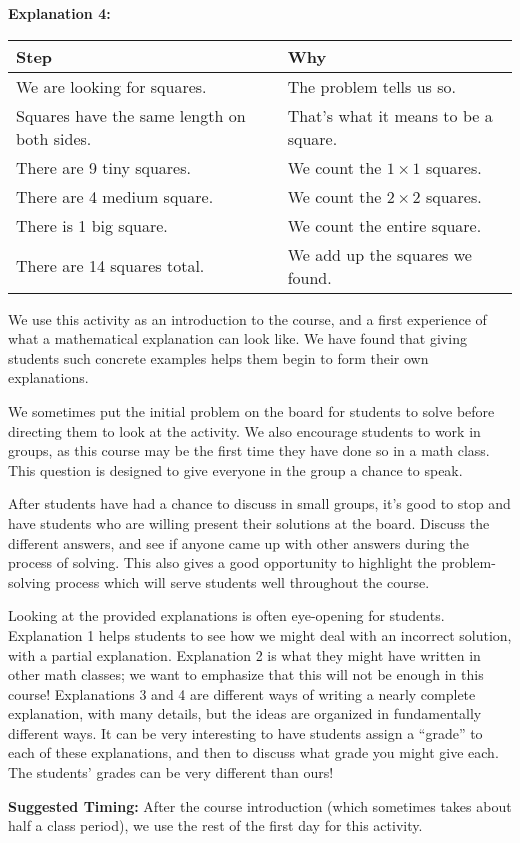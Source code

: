\documentclass{ximera}
\begin{document}
\begin{mdframed}
{\bf Explanation 4:}

\begin{tabularx}{\textwidth}{X|X}
    Step & Why  \\ \hline \hline
    We are looking for squares. & The problem tells us so. \\ \hline
    Squares have the same length on both sides. & That's what it means to be a square. \\ \hline
    There are 9 tiny squares. & We count the $1\times 1$ squares. \\ \hline
    There are 4 medium square. & We count the $2 \times 2$ squares. \\ \hline
    There is 1 big square. & We count the entire square. \\ \hline
    There are 14 squares total. & We add up the squares we found. \\
\end{tabularx}
\end{mdframed}




\newpage


\begin{instructorNotes}
We use this activity as an introduction to the course, and a first experience of what a mathematical explanation can look like.  We have found that giving students such concrete examples helps them begin to form their own explanations.


We sometimes put the initial problem on the board for students to solve before directing them to look at the activity.  We also encourage students to work in groups, as this course may be the first time they have done so in a math class.  This question is designed to give everyone in the group a chance to speak.

After students have had a chance to discuss in small groups, it's good to stop and have students who are willing present their solutions at the board.  Discuss the different answers, and see if anyone came up with other answers during the process of solving.  This also gives a good opportunity to highlight the problem-solving process which will serve students well throughout the course.



Looking at the provided explanations is often eye-opening for students.  Explanation 1 helps students to see how we might deal with an incorrect solution, with a partial explanation.  Explanation 2 is what they might have written in other math classes; we want to emphasize that this will not be enough in this course!  Explanations 3 and 4 are different ways of writing a nearly complete explanation, with many details, but the ideas are organized in fundamentally different ways.  It can be very interesting to have students assign a ``grade'' to each of these explanations, and then to discuss what grade you might give each.  The students' grades can be very different than ours!


{\bf Suggested Timing:} After the course introduction (which sometimes takes about half a class period), we use the rest of the first day for this activity.

\end{instructorNotes}
\end{document}
